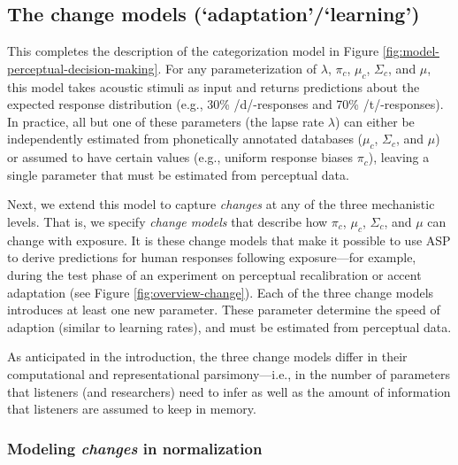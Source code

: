 \documentclass[
  11pt,
  man,floatsintext]{apa6}
\begin{document}
\hypertarget{sec:change-models}{%
\subsection{The change models (`adaptation'/`learning')}\label{sec:change-models}}

This completes the description of the categorization model in Figure \ref{fig:model-perceptual-decision-making}. For any parameterization of \(\lambda\), \(\pi_c\), \(\mu_c\), \(\Sigma_c\), and \(\mu\), this model takes acoustic stimuli as input and returns predictions about the expected response distribution (e.g., 30\% /d/-responses and 70\% /t/-responses). In practice, all but one of these parameters (the lapse rate \(\lambda\)) can either be independently estimated from phonetically annotated databases (\(\mu_c\), \(\Sigma_c\), and \(\mu\)) or assumed to have certain values (e.g., uniform response biases \(\pi_c\)), leaving a single parameter that must be estimated from perceptual data.

Next, we extend this model to capture \emph{changes} at any of the three mechanistic levels. That is, we specify \emph{change models} that describe how \(\pi_c\), \(\mu_c\), \(\Sigma_c\), and \(\mu\) can change with exposure. It is these change models that make it possible to use ASP to derive predictions for human responses following exposure---for example, during the test phase of an experiment on perceptual recalibration or accent adaptation (see Figure \ref{fig:overview-change}). Each of the three change models introduces at least one new parameter. These parameter determine the speed of adaption (similar to learning rates), and must be estimated from perceptual data.

As anticipated in the introduction, the three change models differ in their computational and representational parsimony---i.e., in the number of parameters that listeners (and researchers) need to infer as well as the amount of information that listeners are assumed to keep in memory.

\hypertarget{sec:change-normalization}{%
\subsubsection{\texorpdfstring{Modeling \emph{changes} in normalization}{Modeling changes in normalization}}\label{sec:change-normalization}}
\end{document}

